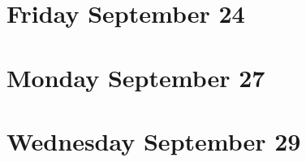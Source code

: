 \newpage
\section*{Friday September 24}



\newpage
\section*{Monday September 27}


\newpage
\section*{Wednesday September 29}


